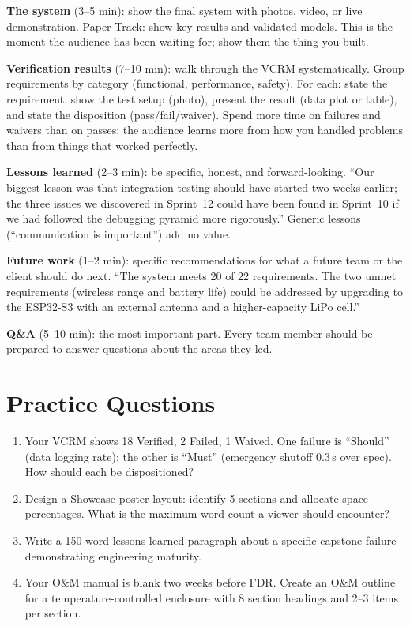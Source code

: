 \textbf{The system} (3--5 min): show the final system with photos, video, or live demonstration. Paper Track: show key results and validated models. This is the moment the audience has been waiting for; show them the thing you built.

\textbf{Verification results} (7--10 min): walk through the VCRM systematically. Group requirements by category (functional, performance, safety). For each: state the requirement, show the test setup (photo), present the result (data plot or table), and state the disposition (pass/fail/waiver). Spend more time on failures and waivers than on passes; the audience learns more from how you handled problems than from things that worked perfectly.

\textbf{Lessons learned} (2--3 min): be specific, honest, and forward-looking. ``Our biggest lesson was that integration testing should have started two weeks earlier; the three issues we discovered in Sprint~12 could have been found in Sprint~10 if we had followed the debugging pyramid more rigorously.'' Generic lessons (``communication is important'') add no value.

\textbf{Future work} (1--2 min): specific recommendations for what a future team or the client should do next. ``The system meets 20 of 22 requirements. The two unmet requirements (wireless range and battery life) could be addressed by upgrading to the ESP32-S3 with an external antenna and a higher-capacity LiPo cell.''

\textbf{Q\&A} (5--10 min): the most important part. Every team member should be prepared to answer questions about the areas they led.


\section{Practice Questions}
\begin{enumerate}[leftmargin=1.5em]
\item Your VCRM shows 18 Verified, 2 Failed, 1 Waived. One failure is ``Should'' (data logging rate); the other is ``Must'' (emergency shutoff 0.3\,s over spec). How should each be dispositioned?
\item Design a Showcase poster layout: identify 5 sections and allocate space percentages. What is the maximum word count a viewer should encounter?
\item Write a 150-word lessons-learned paragraph about a specific capstone failure demonstrating engineering maturity.
\item Your O\&M manual is blank two weeks before FDR. Create an O\&M outline for a temperature-controlled enclosure with 8 section headings and 2--3 items per section.
\end{enumerate}


